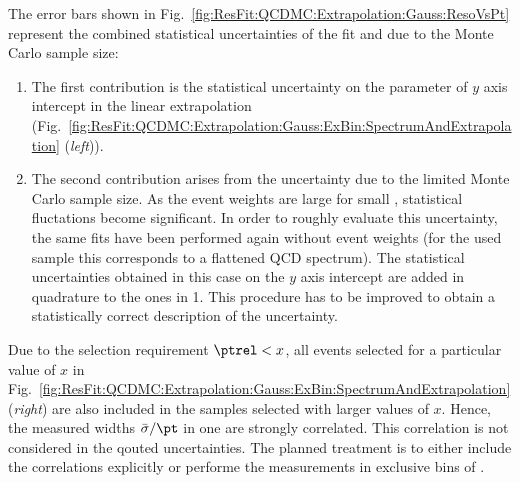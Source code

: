 The error bars shown in Fig.~\ref{fig:ResFit:QCDMC:Extrapolation:Gauss:ResoVsPt} represent the combined statistical uncertainties of the fit and due to the Monte Carlo sample size:
\begin{enumerate}
\item The first contribution is the statistical uncertainty on the parameter of $y$ axis intercept in the linear extrapolation (Fig.~\ref{fig:ResFit:QCDMC:Extrapolation:Gauss:ExBin:SpectrumAndExtrapolation} (\textit{left})).
\item The second contribution arises from the uncertainty due to the limited Monte Carlo sample size.
 As the event weights are large for small \pt, statistical fluctations become significant.
 In order to roughly evaluate this uncertainty, the same fits have been performed again without event weights (for the used sample this corresponds to a flattened QCD spectrum).
 The statistical uncertainties obtained in this case on the $y$ axis intercept are added in quadrature to the ones in 1.
 This procedure has to be improved to obtain a statistically correct description of the uncertainty.
\end{enumerate}

Due to the selection requirement \mbox{$\ptrel < x$}, all events selected for a particular value of $x$ in Fig.~\ref{fig:ResFit:QCDMC:Extrapolation:Gauss:ExBin:SpectrumAndExtrapolation} (\textit{right}) are also included in the samples selected with larger values of $x$.
Hence, the measured widths $\bar{\sigma}/\pt$ in one \pt are strongly correlated.
This correlation is not considered in the qouted uncertainties.
The planned treatment is to either include the correlations explicitly or performe the measurements in exclusive bins of \ptrel.

